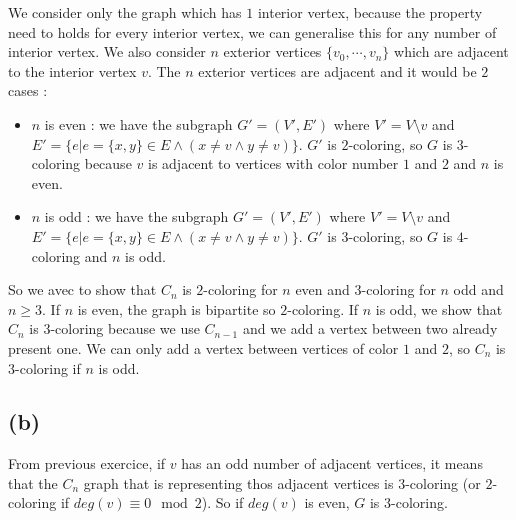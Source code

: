 \documentclass[a4paper,11pt]{report}
\begin{document}
We consider only the graph which has $1$ interior vertex, because the property
need to holds for every interior vertex, we can generalise this for any number
of interior vertex. We also consider $n$ exterior vertices $\{v_0,\cdots,v_n\}$
which are adjacent to the interior vertex $v$. The $n$ exterior vertices are
adjacent and it would be $2$ cases :
\begin{itemize}
\item $n$ is even : we have the subgraph $G' = (V',E')$ where $V' = V
  \setminus v$ and $E' = \{e  | e=\{x,y\} \in E \wedge (x \neq v \wedge y \neq
  v)\}$. $G'$ is $2$-coloring, so $G$ is $3$-coloring because $v$ is adjacent to
  vertices with color number $1$ and $2$ and $n$ is even.
\item $n$ is odd : we have the subgraph $G' = (V',E')$ where $V' = V
  \setminus v$ and $E\prime = \{e  | e=\{x,y\} \in E \wedge (x \neq v \wedge y \neq
  v)\}$. $G'$ is $3$-coloring, so $G$ is $4$-coloring and $n$ is odd.
\end{itemize}

So we avec to show that $C_n$ is $2$-coloring for $n$ even and $3$-coloring for
$n$ odd and $n \geq 3$. If $n$ is even, the graph is bipartite so $2$-coloring.
If $n$ is odd, we show that $C_n$ is $3$-coloring because we use $C_{n-1}$ and
we add a vertex between two already present one. We can only add a vertex
between vertices of color $1$ and $2$, so $C_n$ is $3$-coloring if $n$ is odd.

\subsection*{(b)}

From previous exercice, if $v$ has an odd number of adjacent vertices, it means
that the $C_n$ graph that is representing thos adjacent vertices is $3$-coloring
(or $2$-coloring if $deg(v) \equiv 0 \mod 2$). So if $deg(v)$ is even, $G$ is $3$-coloring.
\end{document}
